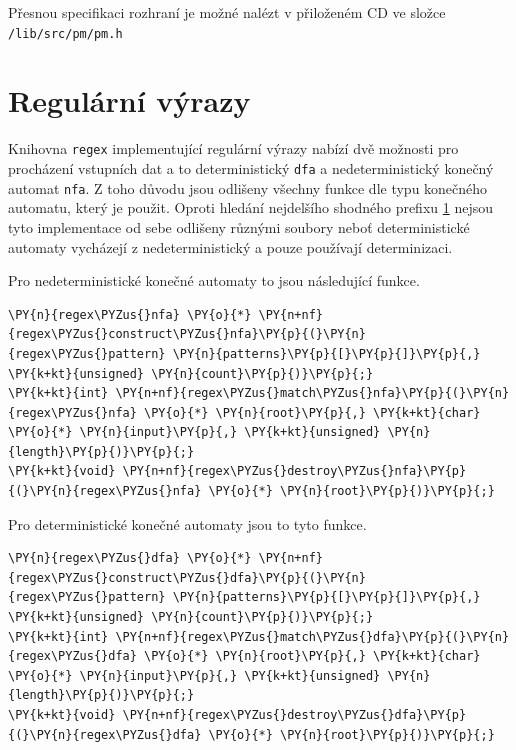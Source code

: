 Přesnou specifikaci rozhraní je možné nalézt v přiloženém CD ve složce \texttt{/lib/src/pm/pm.h}
\section{Regulární výrazy}
Knihovna \texttt{regex} implementující regulární výrazy nabízí dvě možnosti pro procházení
vstupních dat a to deterministický \texttt{dfa} a nedeterministický konečný automat \texttt{nfa}.
Z toho důvodu jsou odlišeny všechny funkce dle typu konečného automatu, který je použit.
Oproti hledání nejdelšího shodného prefixu \ref{} nejsou tyto implementace od sebe odlišeny
různými soubory neboť deterministické automaty vycházejí z nedeterministický a pouze používají
determinizaci.

Pro nedeterministické konečné automaty to jsou následující funkce.

\begin{Verbatim}[commandchars=\\\{\}]
\PY{n}{regex\PYZus{}nfa} \PY{o}{*} \PY{n+nf}{regex\PYZus{}construct\PYZus{}nfa}\PY{p}{(}\PY{n}{regex\PYZus{}pattern} \PY{n}{patterns}\PY{p}{[}\PY{p}{]}\PY{p}{,} \PY{k+kt}{unsigned} \PY{n}{count}\PY{p}{)}\PY{p}{;}
\PY{k+kt}{int} \PY{n+nf}{regex\PYZus{}match\PYZus{}nfa}\PY{p}{(}\PY{n}{regex\PYZus{}nfa} \PY{o}{*} \PY{n}{root}\PY{p}{,} \PY{k+kt}{char} \PY{o}{*} \PY{n}{input}\PY{p}{,} \PY{k+kt}{unsigned} \PY{n}{length}\PY{p}{)}\PY{p}{;}
\PY{k+kt}{void} \PY{n+nf}{regex\PYZus{}destroy\PYZus{}nfa}\PY{p}{(}\PY{n}{regex\PYZus{}nfa} \PY{o}{*} \PY{n}{root}\PY{p}{)}\PY{p}{;}
\end{Verbatim}

Pro deterministické konečné automaty jsou to tyto funkce.
\begin{Verbatim}[commandchars=\\\{\}]
\PY{n}{regex\PYZus{}dfa} \PY{o}{*} \PY{n+nf}{regex\PYZus{}construct\PYZus{}dfa}\PY{p}{(}\PY{n}{regex\PYZus{}pattern} \PY{n}{patterns}\PY{p}{[}\PY{p}{]}\PY{p}{,} \PY{k+kt}{unsigned} \PY{n}{count}\PY{p}{)}\PY{p}{;}
\PY{k+kt}{int} \PY{n+nf}{regex\PYZus{}match\PYZus{}dfa}\PY{p}{(}\PY{n}{regex\PYZus{}dfa} \PY{o}{*} \PY{n}{root}\PY{p}{,} \PY{k+kt}{char} \PY{o}{*} \PY{n}{input}\PY{p}{,} \PY{k+kt}{unsigned} \PY{n}{length}\PY{p}{)}\PY{p}{;}
\PY{k+kt}{void} \PY{n+nf}{regex\PYZus{}destroy\PYZus{}dfa}\PY{p}{(}\PY{n}{regex\PYZus{}dfa} \PY{o}{*} \PY{n}{root}\PY{p}{)}\PY{p}{;}
\end{Verbatim}

